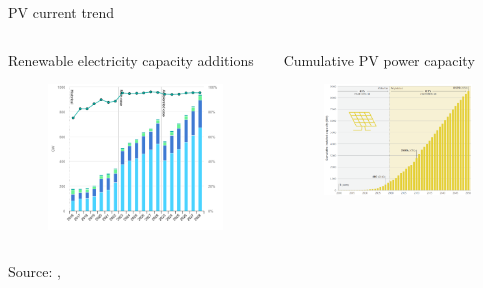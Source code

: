 \documentclass[aspectratio=169, 12pt]{beamer}
\begin{document}
\begin{frame}{PV current trend}
\begin{columns}
  \begin{column}{0.5\columnwidth}
    Renewable electricity capacity additions
    \begin{figure}
    \centering
    \includegraphics[width=0.9\columnwidth]{figure/rec_shares.png}
  \end{figure}
\end{column}
\begin{column}{0.5\columnwidth}
  Cumulative PV power capacity
  \begin{figure}
    \centering
    \includegraphics[width=0.9\columnwidth]{figure/pv_installation.png}
    \end{figure}
  \end{column}
\end{columns}

  {\tiny Source: \cite{irena2019}, \cite{iea2023}}
\end{frame}
\end{document}
